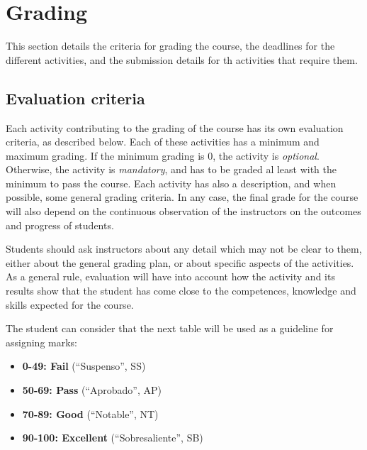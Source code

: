 \documentclass[a4paper]{article}
\begin{document}


\section{Grading}

This section details the criteria for grading the course, the deadlines for the different activities, and the submission details for th activities that require them.

\subsection{Evaluation criteria}

Each activity contributing to the grading of the course has its own evaluation criteria, 
as described below. Each of these activities has a minimum and maximum grading. If the 
minimum grading is 0, the activity is \textit{optional}. Otherwise, the activity is \textit{mandatory}, and 
has to be graded al least with the minimum to pass the course. Each activity has also a 
description, and when possible, some general grading criteria. In any case, the final grade 
for the course will also depend on the continuous observation of the instructors on the 
outcomes and progress of students.

Students should ask instructors about any detail which may not be clear to them, 
either about the general grading plan, or about specific aspects of the activities. 
As a general rule, evaluation will have into account how the activity and its results 
show that the student has come close to the competences, knowledge and skills expected 
for the course.

The student can consider that the next table will be used as a guideline for 
assigning marks:

\begin{itemize}
\item \textbf{0-49: Fail} (``Suspenso'', SS)
\item \textbf{50-69: Pass} (``Aprobado'', AP)
\item \textbf{70-89: Good} (``Notable'', NT)
\item \textbf{90-100: Excellent} (``Sobresaliente'', SB)

\end{itemize}
\end{document}
